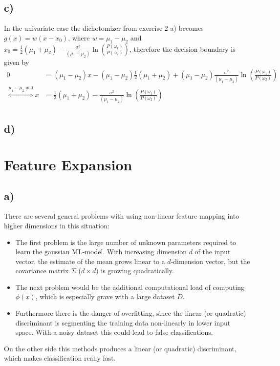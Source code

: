 \documentclass[paper=a4,fontsize=10pt,DIV11,BCOR10mm]{scrartcl}
\begin{document}
\subsection*{c)}
In the univariate case the dichotomizer from exercise 2 a) becomes $g(x)= w(x-x_0)$, where $w=\mu_1-\mu_2$ and $x_0=\frac{1}{2}(\mu_1+\mu_2)-\frac{\sigma^2}{(\mu_1 - \mu_2)}\ln(\frac{P(\omega_1)}{P(\omega_2)})$, therefore the decision boundary is given by 
\begin{align*}
0&=(\mu_1-\mu_2)x - (\mu_1-\mu_2) \frac{1}{2}(\mu_1+\mu_2)+(\mu_1-\mu_2)\frac{\sigma^2}{(\mu_1 - \mu_2)}\ln(\frac{P(\omega_1)}{P(\omega_2)})\\
\stackrel{\mu_1-\mu_2 \neq 0}{\Leftrightarrow} x&=\frac{1}{2}(\mu_1 +\mu_2)-\frac{\sigma^2}{(\mu_1 - \mu_2)}\ln(\frac{P(\omega_1)}{P(\omega_2)})\\
\end{align*}
\subsection*{d)}


\section{Feature Expansion}
	\subsection*{a)} There are several general problems with using non-linear feature mapping into higher dimensions in this situation:
	\begin{itemize}
	\item The first problem is the large number of unknown parameters required to learn the gaussian ML-model. With increasing dimension $d$ of the input vector, the estimate of the mean grows linear to a $d$-dimension vector, but the covariance matrix $\Sigma$ ($d \times d)$ is growing quadratically.
	\item The next problem would be the additional computational load of computing $\phi(x)$, which is especially grave with a large dataset $D$.
	\item Furthermore there is the danger of overfitting, since the linear (or quadratic) discriminant is segmenting the training data non-linearly in lower input space. With a noisy dataset this could lead to false classifications.
	\end{itemize}
	On the other side this methods produces a linear (or quadratic) discriminant, which makes classification really fast.
	
\end{document}

